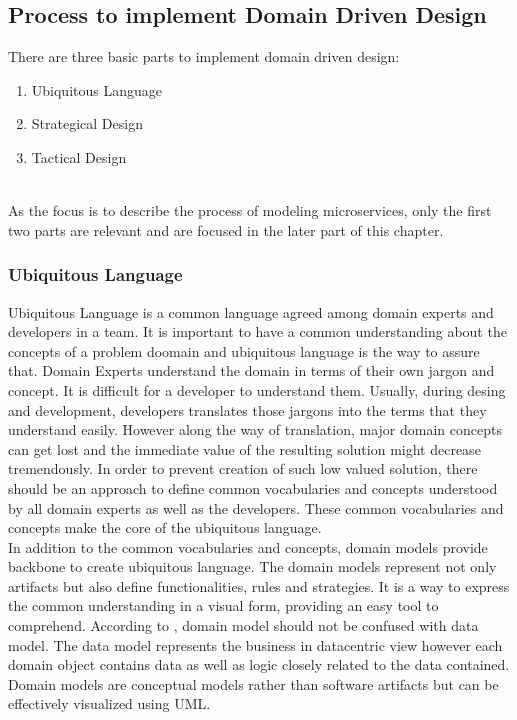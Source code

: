 \subsection{Process to implement Domain Driven Design}\label{section:domain_driven_design/process_to_domain_driven_design}
There are three basic parts to implement domain driven design:
\begin{enumerate}
\item{Ubiquitous Language}
\item{Strategical Design}
\item{Tactical Design}
\end{enumerate}
\\
As the focus is to describe the process of modeling microservices, only the first two parts are relevant and are focused in the later part of this chapter.
\subsubsection{Ubiquitous Language}\label{section:domain_driven_design/process_to_domain_driven_design/ubiquitous_language}
Ubiquitous Language is a common language agreed among domain experts and developers in a team. It is important to have a common understanding about the concepts of a problem doomain and ubiquitous language is the way to assure that. Domain Experts understand the domain in terms of their own jargon and concept. It is difficult for a developer to understand them. Usually, during desing and development, developers translates those jargons into the terms that they understand easily. However along the way of translation, major domain concepts can get lost and the immediate value of the resulting solution might decrease tremendously. In order to prevent creation of such low valued solution, there should be an approach to define common vocabularies and concepts understood by all domain experts as well as the developers. These common vocabularies and concepts make the core of the ubiquitous language.\cite{Evans:2003aa}\cite{Vernon:2013aa}
\\
In addition to the common vocabularies and concepts, domain models provide backbone to create ubiquitous language. The domain models represent not only artifacts but also define functionalities, rules and strategies. It is a way to express the common understanding in a visual form, providing an easy tool to comprehend.\cite{Evans:2003aa}\cite{Fowler:2006aa} According to \cite{Fowler:2003aa}, domain model should not be confused with data model. The data model represents the business in datacentric view however each domain object contains data as well as logic closely related to the data contained. Domain models are conceptual models rather than software artifacts but can be effectively visualized using \acrshort{UML}. \cite{Scott:2001aa}

